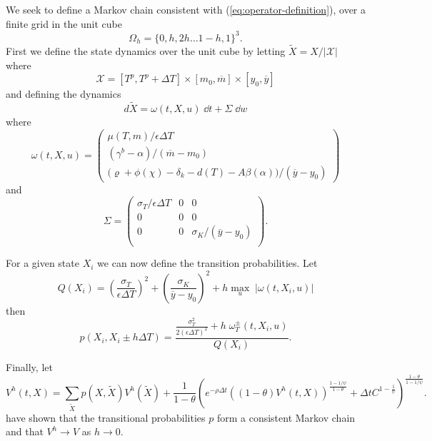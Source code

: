 \documentclass[../../main.tex]{subfiles}
\begin{document}
We seek to define a Markov chain consistent with (\ref{eq:operator-definition}), over a finite grid in the unit cube \begin{equation}\Omega_h = \{0, h, 2h \ldots 1 - h, 1\}^3.\end{equation} First we define the state dynamics over the unit cube by letting $\tilde{X} = X / \lvert\mathcal{X}\rvert$ where \begin{equation}
    \mathcal{X} = [T^p, T^p + \Delta T] \times [m_0, \overline{m}] \times [y_0, \overline{y}]
\end{equation} and defining the dynamics \begin{equation}
    d \tilde{X} = \omega(t, X, u) \; \dd{t} + \Sigma \; \dd{w}
\end{equation} where \begin{equation}
    \omega(t, X, u) = \begin{pmatrix}
        \mu(T, m) / \epsilon \Delta T \\
        (\gamma^{b} - \alpha) / (\overline{m} - m_0) \\
        \big(\varrho + \phi(\chi) - \delta_k - d(T) - A \beta(\alpha) \big) / (\overline{y} - y_0)
    \end{pmatrix} 
\end{equation} and \begin{equation}
    \Sigma = \begin{pmatrix}
        \sigma_T / \epsilon \Delta T  & 0 & 0 \\
        0 & 0 & 0 \\
        0 & 0 & \sigma_K / (\overline{y} - y_0)\\
    \end{pmatrix}.
\end{equation}

For a given state $X_i$ we can now define the transition probabilities. Let \begin{equation}
    Q(X_i) = \left(\frac{\sigma_T}{\epsilon \Delta T}\right)^2 + \left(\frac{\sigma_K}{\overline{y} - y_0}\right)^2 + h \max_u \; \lvert \omega(t, X_i, u)  \rvert
\end{equation} then \begin{equation}
    p(X_i, X_i \pm h \Delta T) = \frac{\frac{\sigma^2_T}{2(\epsilon \Delta T)^2} + h \; \omega^{\pm}_T(t, X_i, u)}{Q(X_i)}.
\end{equation}

Finally, let \begin{equation}
    V^h(t, X) = \sum_{\tilde{X}} p(X, \tilde{X}) V^h(\tilde{X}) + \frac{1}{1 - \theta} \left(e^{-\rho \Delta t} ((1 - \theta) V^h(t, X))^{\frac{1 - 1 / \psi}{1 - \theta}} + \Delta t C^{1 - \frac{1}{\psi}} \right)^{\frac{1 - \theta}{1 - 1 / \psi}}.
\end{equation} \citep{kushner_numerical_2001} have shown that the transitional probabilities $p$ form a consistent Markov chain and that $V^h \to V$ as $h \to 0$.
\end{document}
